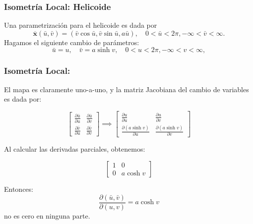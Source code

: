 \documentclass[10pt]{beamer}
\begin{document}
  \begin{frame}
  \frametitle{Isometría Local: Helicoide}
  Una parametrización para el helicoide es dada por
  \[
  \overline{\mathbf{x}}(\bar{u}, \bar{v})=(\bar{v} \cos \bar{u}, \bar{v} \sin \bar{u}, a \bar{u}), \quad 0<\bar{u}<2 \pi,-\infty<\bar{v}<\infty .
  \]
  Hagamos el siguiente cambio de parámetros:
  \[
  \bar{u}=u, \quad \bar{v}=a \sinh v, \quad 0<u<2 \pi,-\infty<v<\infty,
  \]
  \end{frame}
  
  \begin{frame}
  \frametitle{Isometría Local: }
  El mapa es claramente uno-a-uno, y la matriz Jacobiana del cambio de variables es dada por:

\[
\begin{bmatrix}
\frac{\partial \bar{u}}{\partial u} & \frac{\partial \bar{u}}{\partial v} \\
\frac{\partial \bar{v}}{\partial u} & \frac{\partial \bar{v}}{\partial v}
\end{bmatrix}\implies 
\begin{bmatrix}
\frac{\partial u}{\partial u} & \frac{\partial u}{\partial v} \\
\frac{\partial (a \sinh v)}{\partial u} & \frac{\partial (a \sinh v)}{\partial v}
\end{bmatrix}
\]

Al calcular las derivadas parciales, obtenemos:

\[
\begin{bmatrix}
1 & 0 \\
0 & a \cosh v
\end{bmatrix}
\]

Entonces: 
  \[
  \frac{\partial(\bar{u}, \bar{v})}{\partial(u, v)}=a \cosh v
  \]
  no es cero en ninguna parte. 
  \end{frame}
\end{document}
